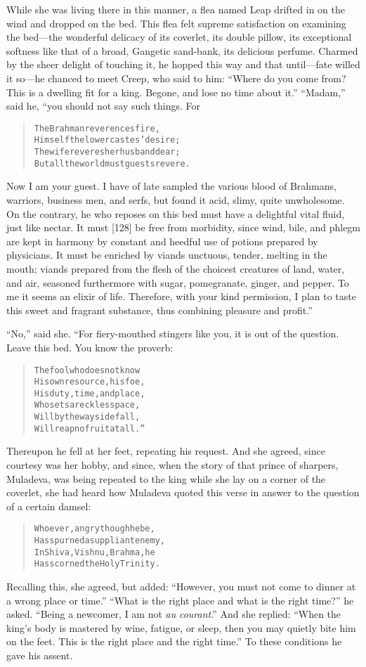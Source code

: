 \documentclass[article, twoside, 14pt]{memoir}
\renewenvironment{verbatim}{%
\begin{quote}%
\vskip -10pt%
\begin{alltt}\normalfont\large}{\end{alltt}%
\end{quote}%
\vskip -10pt
} %
\begin{document}
While she was living there in this manner, a flea named Leap
drifted in on the wind and dropped on the bed. This flea felt
supreme satisfaction on examining the bed---the wonderful delicacy
of its coverlet, its double pillow, its exceptional softness like
that of a broad, Gangetic sand-bank, its delicious perfume. Charmed
by the sheer delight of touching it, he hopped this way and that
until---fate willed it so---he chanced to meet Creep, who said to
him:
``Where do you come from? This is a dwelling fit for a king. Begone, and lose no time about it.''
``Madam,'' said he, “you should not say such things. For

\begin{verbatim}
The Brahman reverences fire,
Himself the lower castes' desire;
The wife reveres her husband dear;
But all the world must guests revere.
\end{verbatim}
Now I am your guest. I have of late sampled the various blood of
Brahmans, warriors, business men, and serfs, but found it acid,
slimy, quite unwholesome. On the contrary, he who reposes on this
bed must have a delightful vital fluid, just like nectar. It must
[128] be free from morbidity, since wind, bile, and phlegm are kept
in harmony by constant and heedful use of potions prepared by
physicians. It must be enriched by viands unctuous, tender, melting
in the mouth; viands prepared from the flesh of the choicest
creatures of land, water, and air, seasoned furthermore with sugar,
pomegranate, ginger, and pepper. To me it seems an elixir of life.
Therefore, with your kind permission, I plan to taste this sweet
and fragrant substance, thus combining pleasure and profit.”

``No,'' said she. “For fiery-mouthed stingers like you, it is out
of the question. Leave this bed. You know the proverb:

\begin{verbatim}
The fool who does not know
His own resource, his foe,
His duty, time, and place,
Who sets a reckless pace,
Will by the wayside fall,
Will reap no fruit at all.”
\end{verbatim}
Thereupon he fell at her feet, repeating his request. And she
agreed, since courtesy was her hobby, and since, when the story of
that prince of sharpers, Muladeva, was being repeated to the king
while she lay on a corner of the coverlet, she had heard how
Muladeva quoted this verse in answer to the question of a certain
damsel:

\begin{verbatim}
Whoever, angry though he be,
Has spurned a suppliant enemy,
In Shiva, Vishnu, Brahma, he
Has scorned the Holy Trinity.
\end{verbatim}
Recalling this, she agreed, but added:
``However, you must not come to dinner at a wrong place or time.''
``What is the right place and what is the right time?'' he asked.
``Being a newcomer, I am not \emph{au} \emph{courant}.'' And she
replied:
``When the king's body is mastered by wine, fatigue, or sleep, then you may quietly bite him on the feet. This is the right place and the right time.''
To these conditions he gave his assent.
\end{document}
